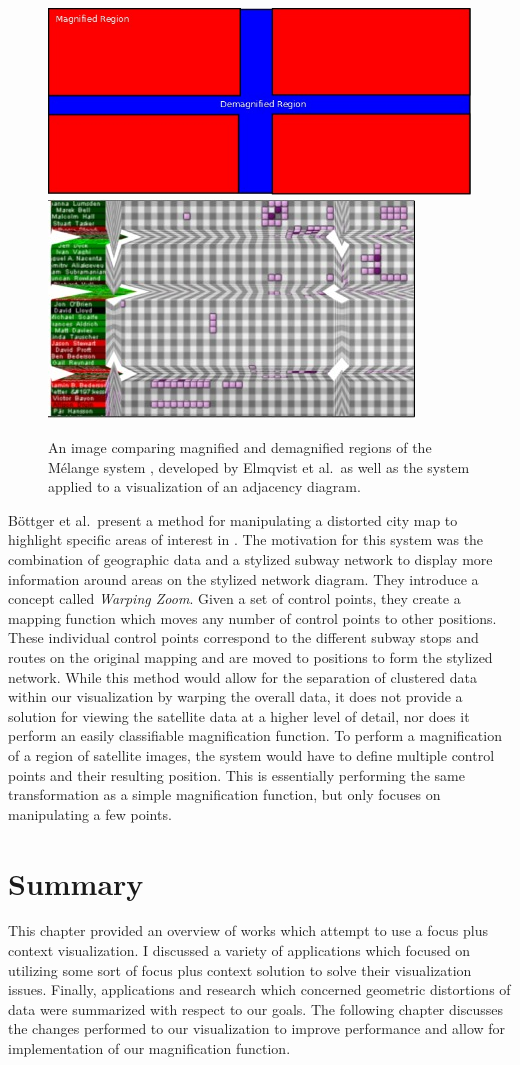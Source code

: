 \begin{figure}[htp] \centering
    \includegraphics[width=0.45\linewidth]{img/Melange.jpg}
    \includegraphics[width=0.45\linewidth]{img/melange_actual.jpg}
    \caption[M\'{e}lange Diagram]{An image comparing magnified and demagnified regions of the M\'{e}lange system 
    \cite{Elmqvist2010}, developed by Elmqvist et al.\ as well as the system applied to a visualization of an   
    adjacency diagram.}
    \label{fig:melange}
\end{figure}

B\"{o}ttger et al.\ present a method for manipulating a distorted city map to highlight specific areas of interest in \cite{Bottger2008}. The motivation for this system was the combination of geographic data and a stylized subway network to display more information around areas on the stylized network diagram. They introduce a concept called \emph{Warping Zoom}. Given a set of control points, they create a mapping function which moves any number of control points to other positions.
These individual control points correspond to the different subway stops and routes on the original mapping and are moved to positions to form the stylized network. While this method would allow for the separation of clustered data within our visualization by warping the overall data, it does not provide a solution for viewing the satellite data at a higher level of detail, nor does it perform an easily classifiable magnification function. To perform a magnification of a region of
satellite images, the system would have to define multiple control points and their resulting position. This is essentially performing the same transformation as a simple magnification function, but only focuses on manipulating a few points. 

\section{Summary}
\label{section:PREVIOUS_WORK_SUMMARY}

This chapter provided an overview of works which attempt to use a focus plus context visualization. I discussed a variety of applications which focused on utilizing some sort of focus plus context solution to solve their visualization issues. Finally, applications and research which concerned geometric distortions of data were summarized with respect to our goals. The following chapter discusses the changes performed to our visualization to improve performance and allow for implementation of our magnification function.
